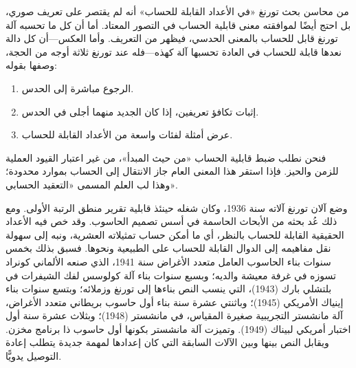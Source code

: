 \documentclass[../../../include/open-logic-section]{subfiles}
\begin{document}
\begin{digress}
من محاسن بحث تورنغ «في الأعداد القابلة للحساب» أنه لم يقتصر على تعريف صوري، بل احتج أيضًا لموافقته معنى قابلية الحساب في التصور المعتاد. أما أن كل ما تحسبه آلة تورنغ قابل للحساب بالمعنى الحدسي، فيظهر من التعريف. وأما العكس---أن كل دالة نعدها قابلة للحساب في العادة تحسبها آلة كهذه---فله عند تورنغ ثلاثة أوجه من الحجة، وصفها بقوله:
\begin{enumerate}
\item الرجوع مباشرة إلى الحدس.
\item إثبات تكافؤ تعريفين، إذا كان الجديد منهما أجلى في الحدس.
\item عرض أمثلة لفئات واسعة من الأعداد القابلة للحساب.
\end{enumerate}
فنحن نطلب ضبط قابلية الحساب «من حيث المبدأ»، من غير اعتبار القيود العملية للزمن والحيز. فإذا استقر هذا المعنى العام جاز الانتقال إلى الحساب بموارد محدودة؛ وهذا لب العلم المسمى «التعقيد الحسابي».
\end{digress}

\begin{history}
وضع آلان تورنغ آلاته سنة 1936، وكان شغله حينئذ قابلية تقرير منطق الرتبة الأولى. ومع ذلك عُد بحثه من الأبحاث الحاسمة في أسس تصميم الحاسوب. وقد خص فيه الأعداد الحقيقية القابلة للحساب بالنظر، أي ما أمكن حساب تمثيلاته العشرية، ونبه إلى سهولة نقل مفاهيمه إلى الدوال القابلة للحساب على الطبيعية ونحوها. فسبق بذلك بخمس سنوات بناء الحاسوب العامل متعدد الأغراض سنة 1941، الذي صنعه الألماني كونراد تسوزه في غرفة معيشة والديه؛ وبسبع سنوات بناء آلة كولوسس لفك الشيفرات في بلتشلي بارك (1943)، التي ينسب النص بناءها إلى تورنغ وزملائه؛ وبتسع سنوات بناء إينياك الأمريكي (1945)؛ وباثنتي عشرة سنة بناء أول حاسوب بريطاني متعدد الأغراض، آلة مانشستر التجريبية صغيرة المقياس، في مانشستر (1948)؛ وبثلاث عشرة سنة أول اختبار أمريكي لبيناك (1949). وتميزت آلة مانشستر بكونها أول حاسوب ذا برنامج مخزن. ويقابل النص بينها وبين الآلات السابقة التي كان إعدادها لمهمة جديدة يتطلب إعادة التوصيل يدويًّا.
\end{history}
\end{document}
